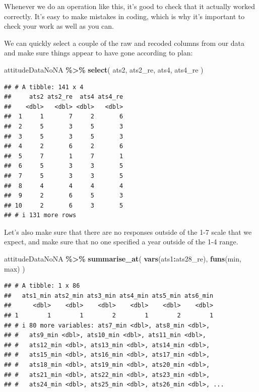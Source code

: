 \documentclass[
  12pt,
]{book}
\newenvironment{Shaded}{\begin{snugshade}}{\end{snugshade}}
\newcommand{\FunctionTok}[1]{\textcolor[rgb]{0.13,0.29,0.53}{\textbf{#1}}}
\newcommand{\NormalTok}[1]{#1}
\newcommand{\SpecialCharTok}[1]{\textcolor[rgb]{0.81,0.36,0.00}{\textbf{#1}}}
\begin{document}
Whenever we do an operation like this, it's good to check that it actually worked correctly. It's easy to make mistakes in coding, which is why it's important to check your work as well as you can.

We can quickly select a couple of the raw and recoded columns from our data and make sure things appear to have gone according to plan:

\begin{Shaded}
\begin{Highlighting}[]
\NormalTok{attitudeDataNoNA }\SpecialCharTok{\%\textgreater{}\%} 
  \FunctionTok{select}\NormalTok{(}
\NormalTok{    ats2,}
\NormalTok{    ats2\_re,}
\NormalTok{    ats4,}
\NormalTok{    ats4\_re}
\NormalTok{  )}
\end{Highlighting}
\end{Shaded}

\begin{verbatim}
## # A tibble: 141 x 4
##     ats2 ats2_re  ats4 ats4_re
##    <dbl>   <dbl> <dbl>   <dbl>
##  1     1       7     2       6
##  2     5       3     5       3
##  3     5       3     5       3
##  4     2       6     2       6
##  5     7       1     7       1
##  6     5       3     3       5
##  7     5       3     3       5
##  8     4       4     4       4
##  9     2       6     5       3
## 10     2       6     3       5
## # i 131 more rows
\end{verbatim}

Let's also make sure that there are no responses outside of the 1-7 scale that we expect, and make sure that no one specified a year outside of the 1-4 range.

\begin{Shaded}
\begin{Highlighting}[]
\NormalTok{attitudeDataNoNA }\SpecialCharTok{\%\textgreater{}\%} 
  \FunctionTok{summarise\_at}\NormalTok{(}
    \FunctionTok{vars}\NormalTok{(ats1}\SpecialCharTok{:}\NormalTok{ats28\_re),}
    \FunctionTok{funs}\NormalTok{(min, max)}
\NormalTok{  )}
\end{Highlighting}
\end{Shaded}

\begin{verbatim}
## # A tibble: 1 x 86
##   ats1_min ats2_min ats3_min ats4_min ats5_min ats6_min
##      <dbl>    <dbl>    <dbl>    <dbl>    <dbl>    <dbl>
## 1        1        1        2        1        2        1
## # i 80 more variables: ats7_min <dbl>, ats8_min <dbl>,
## #   ats9_min <dbl>, ats10_min <dbl>, ats11_min <dbl>,
## #   ats12_min <dbl>, ats13_min <dbl>, ats14_min <dbl>,
## #   ats15_min <dbl>, ats16_min <dbl>, ats17_min <dbl>,
## #   ats18_min <dbl>, ats19_min <dbl>, ats20_min <dbl>,
## #   ats21_min <dbl>, ats22_min <dbl>, ats23_min <dbl>,
## #   ats24_min <dbl>, ats25_min <dbl>, ats26_min <dbl>, ...
\end{verbatim}
\end{document}
